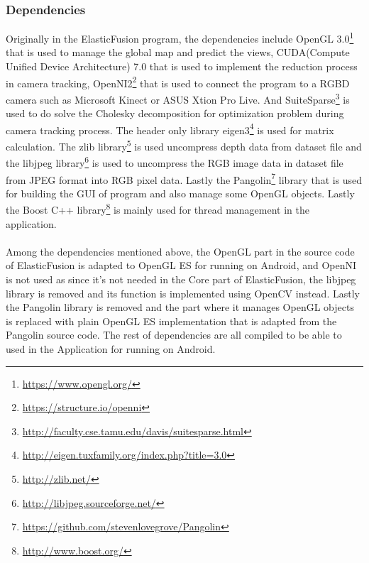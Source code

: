 \documentclass[12pt,twoside]{article}
\begin{document}
\subsubsection{Dependencies}
Originally in the ElasticFusion program, the dependencies include OpenGL 3.0\footnote{\url{https://www.opengl.org/}} that is used to manage the global map and predict the views, CUDA(Compute Unified Device Architecture) 7.0 that is used to implement the reduction process in camera tracking, OpenNI2\footnote{\url{https://structure.io/openni}} that is used to connect the program to a RGBD camera such as Microsoft Kinect or ASUS Xtion Pro Live. And SuiteSparse\footnote{\url{http://faculty.cse.tamu.edu/davis/suitesparse.html}} is used to do solve the Cholesky decomposition for optimization problem during camera tracking process. The header only library eigen3\footnote{\url{http://eigen.tuxfamily.org/index.php?title=3.0}} is used for matrix calculation. The zlib library\footnote{\url{http://zlib.net/}} is used uncompress depth data from dataset file and the libjpeg library\footnote{\url{http://libjpeg.sourceforge.net/}} is used to uncompress the RGB image data in dataset file from JPEG format into RGB pixel data. Lastly the Pangolin\footnote{\url{https://github.com/stevenlovegrove/Pangolin}} library that is used for building the GUI of program and also manage some OpenGL objects. Lastly the Boost C++ library\footnote{\url{http://www.boost.org/}} is mainly used for thread management in the application. \\
\\
Among the dependencies mentioned above, the OpenGL part in the source code of ElasticFusion is adapted to OpenGL ES for running on Android, and OpenNI is not used as since it's not needed in the Core part of ElasticFusion, the libjpeg library is removed and its function is implemented using OpenCV instead. Lastly the Pangolin library is removed and the part where it manages OpenGL objects is replaced with plain OpenGL ES implementation that is adapted from the Pangolin source code. The rest of dependencies are all compiled to be able to used in the Application for running on Android.\\
\end{document}
